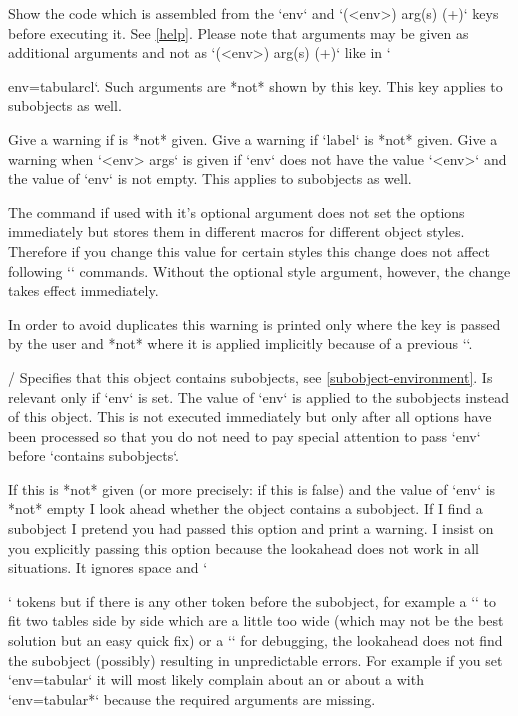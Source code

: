   Show the code which is assembled from the `env` and `(<env>) arg(s) (+)` keys before executing it.
  See \cref{help}.
  Please note that arguments may be given as additional arguments and not as `(<env>) arg(s) (+)` like in `\begin{tableobject}{env=tabular}{cl}`.
  Such arguments are *not* shown by this key.
  This key applies to subobjects as well.

  Give a warning if  is *not* given.
  Give a warning if `label` is *not* given.
  Give a warning when `<env> args` is given if `env` does not have the value `<env>` and the value of `env` is not empty.
  This applies to subobjects as well.

  The \cmd{\objectset} command if used with it's optional argument does not set the options immediately but stores them in different macros for different object styles.
  Therefore if you change this value for certain styles this change does not affect following `\objectset` commands.
  Without the optional style argument, however, the change takes effect immediately.

  In order to avoid duplicates this warning is printed only where the key is passed by the user
  and *not* where it is applied implicitly because of a previous ``.

 /
  Specifies that this object contains subobjects, see \cref{subobject-environment}.
  Is relevant only if `env` is set.
  The value of `env` is applied to the subobjects instead of this object.
  This is not executed immediately but only after all options have been processed so that you do not need to pay special attention to pass `env` before `contains subobjects`.

  If this is *not* given (or more precisely: if this is false)
  and the value of `env` is *not* empty I look ahead whether the object contains a subobject.
  If I find a subobject I pretend you had passed this option and print a warning.
  I insist on you explicitly passing this option because the lookahead does not work in all situations.
  It ignores space and `\par` tokens but if there is any other token before the subobject,
  for example a `\small` to fit two tables side by side which are a little too wide
  (which may not be the best solution but an easy quick fix)
  or a `\typeout` for debugging,
  the lookahead does not find the subobject (possibly) resulting in unpredictable errors.
  For example if you set `env=tabular` it will most likely complain about an 
  or about a  with `env=tabular*` because the required arguments are missing.
\endkeydoc



\end{tableobject}
